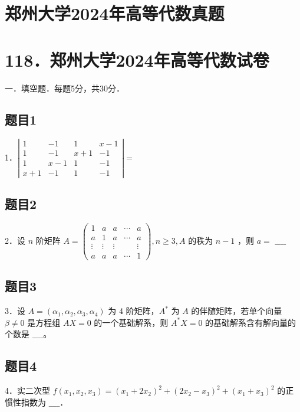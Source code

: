 \documentclass{article}
\begin{document}
\section*{郑州大学2024年高等代数真题}
\section*{118．郑州大学2024年高等代数试卷}
一．填空题．每题5分，共30分．\\

\subsection{题目1}
1．\(\left|\begin{array}{cccc}1 & -1 & 1 & x-1 \\ 1 & -1 & x+1 & -1 \\ 1 & x-1 & 1 & -1 \\ x+1 & -1 & 1 & -1\end{array}\right|=\)

\subsection{题目2}
2．设 \(n\) 阶矩阵 \(A=\left(\begin{array}{ccccc}1 & a & a & \cdots & a \\ a & 1 & a & \cdots & a \\ \vdots & \vdots & \vdots & & \vdots \\ a & a & a & \cdots & 1\end{array}\right), n \geq 3, A\) 的秩为 \(n-1\) ，则 \(a=\) \(\_\_\_\_\)

\subsection{题目3}
3．设 \(A=\left(\alpha_{1}, \alpha_{2}, \alpha_{3}, \alpha_{4}\right)\) 为 4 阶矩阵，\(A^{*}\) 为 \(A\) 的伴随矩阵，若单个向量 \(\beta \neq 0\) 是方程组 \(A X=0\) 的一个基础解系，则 \(A^{*} X=0\) 的基础解系含有解向量的个数是 \(\_\_\_\_\)。

\subsection{题目4}
4．实二次型 \(f\left(x_{1}, x_{2}, x_{3}\right)=\left(x_{1}+2 x_{2}\right)^{2}+\left(2 x_{2}-x_{3}\right)^{2}+\left(x_{1}+x_{3}\right)^{2}\) 的正惯性指数为 \(\_\_\_\_\)．
\end{document}
